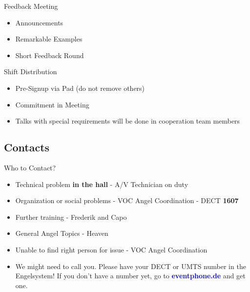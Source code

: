 \documentclass[hyperref={pdfpagelabels=false},aspectratio=169]{beamer}
\begin{document}
\begin{frame}{Feedback Meeting}
\begin{itemize}
	\item Announcements
	\item Remarkable Examples
	\item Short Feedback Round 
\end{itemize} 
\end{frame}

\begin{frame}{Shift Distribution}
\begin{itemize}
	\item Pre-Signup via Pad (do not remove others) %
	\item Commitment in Meeting %
	\item Talks with special requirements will be done in cooperation team members %
\end{itemize} 
\end{frame}


\subsection{Contacts}
\begin{frame}{Who to Contact?}
\begin{itemize}
\item Technical problem \textbf{in the hall} - A/V Technician on duty
\item Organization or social problems - VOC Angel Coordination - DECT \textbf{1607}
\item Further training - Frederik and Capo
\item General Angel Topics - Heaven
\item Unable to find right person for issue - VOC Angel Coordination
\item We might need to call you. Please have your DECT or UMTS number in the Engelsystem! If you don't have a number yet, go to 
\textcolor{blue}{\textbf{eventphone.de}} and get one. 
\end{itemize} 
\end{frame}


\end{document}
